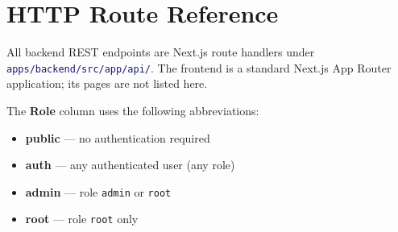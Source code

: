\documentclass[12pt,a4paper,twoside]{report}
\newcommand{\code}[1]{\texttt{#1}}
\newcommand{\file}[1]{\texttt{\textcolor{MidnightBlue}{#1}}}
\begin{document}
\chapter{HTTP Route Reference}
\label{app:routes}

All backend REST endpoints are Next.js route handlers under
\file{apps/backend/src/app/api/}. The frontend is a standard Next.js
App Router application; its pages are not listed here.

The \textbf{Role} column uses the following abbreviations:

\begin{itemize}
  \item \textbf{public} — no authentication required
  \item \textbf{auth} — any authenticated user (any role)
  \item \textbf{admin} — role \code{admin} or \code{root}
  \item \textbf{root} — role \code{root} only
\end{itemize}
\end{document}
